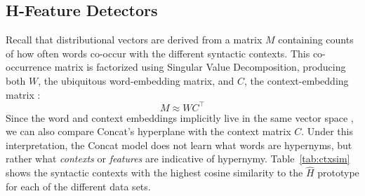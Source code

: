 \subsection{H-Feature Detectors}

Recall that distributional vectors are derived from a matrix $M$ containing
counts of how often words co-occur with the different syntactic contexts. This
co-occurrence matrix is factorized using Singular Value Decomposition,
producing both $W$, the ubiquitous word-embedding matrix, and $C$, the context-embedding
matrix \cite{levy:2014:nips}:
\begin{equation*}
  M \approx WC^{\top}
\end{equation*}
Since the word and context embeddings implicitly live in the same vector space
\cite{melamud:2015:vsm}, we can also compare Concat's hyperplane with the
context matrix $C$. Under this interpretation, the Concat model
does not learn what words are hypernyms, but rather what {\em contexts} or
{\em features} are indicative of hypernymy.
Table~\ref{tab:ctxsim} shows the syntactic contexts with the
highest cosine similarity to the $\hat H$ prototype for each of the different data sets.

